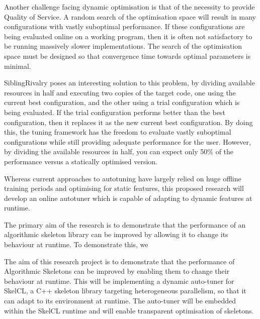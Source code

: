 Another challenge facing dynamic optimisation is that of the necessity
to provide Quality of Service. A random search of the optimisation
space will result in many configurations with vastly suboptimal
performance. If these configurations are being evaluated online on a
working program, then it is often not satisfactory to be running
massively slower implementations. The search of the optimisation space
must be designed so that convergence time towards optimal parameters
is minimal.

SiblingRivalry poses an interesting solution to this problem, by
dividing available resources in half and executing two copies of the
target code, one using the current best configuration, and the other
using a trial configuration which is being evaluated. If the trial
configuration performs better than the best configuration, then it
replaces it as the new current best configuration. By doing this, the
tuning framework has the freedom to evaluate vastly suboptimal
configurations while still providing adequate performance for the
user. However, by dividing the available resources in half, you can
expect only 50\% of the performance versus a statically optimised
version.


Whereas current approaches to autotuning have largely relied on huge
offline training periods and optimising for static features, this
proposed research will develop an online autotuner which is capable of
adapting to dynamic features at runtime.

The primary aim of the research is to demonstrate that the performance
of an algorithmic skeleton library can be improved by allowing it to
change its behaviour at runtime. To demonstrate this, we


The aim of this research project is to demonstrate that the
performance of Algorithmic Skeletons can be improved by enabling them
to change their behaviour at runtime. This will be implementing a
dynamic auto-tuner for SkelCL, a C++ skeleton library targeting
heterogeneous parallelism, so that it can adapt to its environment at
runtime. The auto-tuner will be embedded within the SkelCL runtime and
will enable transparent optimisation of skeletons.

